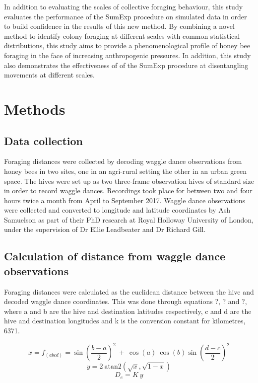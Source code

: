 \documentclass[11pt,usenames,dvipsnames]{article}
\begin{document}
In addition to evaluating the scales of collective foraging behaviour, this study evaluates the performance of the SumExp procedure on simulated data in order to build confidence in the results of this new method. By combining a novel method to identify colony foraging at different scales with common statistical distributions, this study aims to provide a phenomenological profile of honey bee foraging in the face of increasing anthropogenic pressures. In addition, this study also demonstrates the effectiveness of of the SumExp procedure at disentangling movements at different scales.

\section{Methods}

\subsection{Data collection}
Foraging distances were collected by decoding waggle dance observations from honey bees in two sites, one in an agri-rural setting the other in an urban green space. The hives were set up as two three-frame observation hives of standard size in order to record waggle dances. Recordings took place for between two and four hours twice a month from April to September 2017. Waggle dance observations were collected and converted to longitude and latitude coordinates by Ash Samuelson as part of their PhD research at Royal Holloway University of London, under the supervision of Dr Ellie Leadbeater and Dr Richard Gill.

\subsection{Calculation of distance from waggle dance observations}
Foraging distances were calculated as the euclidean distance between the hive and decoded waggle dance coordinates. This was done through equations ?, ? and ?, where a and b are the hive and destination latitudes respectively, c and d are the hive and destination longitudes and k is the conversion constant for kilometres, 6371.

\begin{equation}
x = f_{(abcd)} = \sin\left(\frac{b - a}{2}\right)^2\ +\ \cos(a)\ \cos(b) \sin\left(\frac{d - c}{2}\right)^2 
\end{equation}
\begin{equation}
y = 2\ \text{atan2}(\sqrt{x}, \sqrt{1 - x})
\end{equation}
\begin{equation}
D_e = K\ y
\end{equation}
\end{document}
